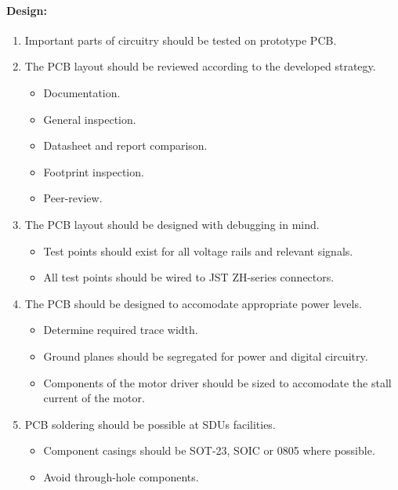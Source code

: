 \paragraph{Design:}
\begin{enumerate}[resume]
	\item Important parts of circuitry should be tested on prototype PCB.
	\label{enum:important_prototype}
	\item The PCB layout should be reviewed according to the developed strategy.
	\label{enum:pcb_strategy}
	\begin{itemize}
		\item Documentation.
		\item General inspection.
		\item Datasheet and report comparison.
		\item Footprint inspection.
		\item Peer-review.
	\end{itemize}
	\item The PCB layout should be designed with debugging in mind.
	\label{enum:pcb_debugging}
	\begin{itemize}
		\item Test points should exist for all voltage rails and relevant signals.
		\item All test points should be wired to JST ZH-series connectors.
	\end{itemize}
	\item The PCB should be designed to accomodate appropriate power levels.
	\label{enum:pcb_layout}
	\begin{itemize}
		\item Determine required trace width.
		\item Ground planes should be segregated for power and digital circuitry.
		\item Components of the motor driver should be sized to accomodate the stall current of the motor.
	\end{itemize}
	\item PCB soldering should be possible at SDUs facilities.
	\label{enum:pcb_soldering}
	\begin{itemize}
		\item Component casings should be SOT-23, SOIC or 0805 where possible.
		\item Avoid through-hole components.
	\end{itemize}
\end{enumerate}

